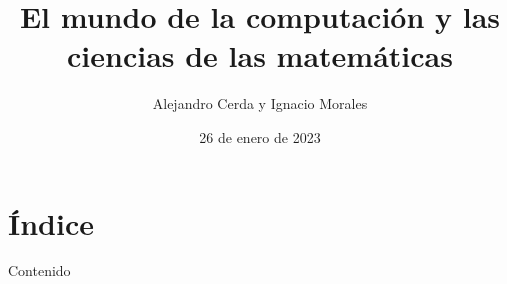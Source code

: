 \documentclass[pdf]{beamer}
\title{El mundo de la computación y las ciencias de las matemáticas}
\author{Alejandro Cerda y Ignacio Morales}
\date{26 de enero de 2023}
\begin{document}
\maketitle

\section{Índice}


\begin{frame}{Contenido}
    
    \begin{columns}[t]
        \begin{column}{.5\textwidth}
            \tableofcontents[sections={1-5}]
        \end{column}
        \begin{column}{.5\textwidth}
            \tableofcontents[sections={6-11}]
        \end{column}
    \end{columns}
\end{frame}
\end{document}
